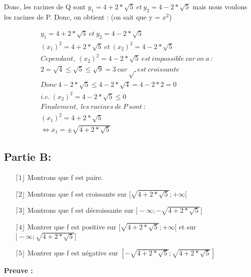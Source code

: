 \documentclass[a4paper, 12pt]{article}
\begin{document}
Donc, les racines de Q sont \( y_1 = 4 + 2 * \sqrt{5} ~ et ~ y_2 = 4 - 2 * \sqrt{5}  \) mais nous voulons les racines de P. Donc, on obtient : (on sait que y = $x^2$)


\begin{align*}
	y_1 = 4 + 2 * \sqrt{5} ~ et ~ y_2 = 4 - 2 * \sqrt{5} \\
	(x_1)^2 = 4 + 2 * \sqrt{5} ~ et ~ (x_2)^2 = 4 - 2 * \sqrt{5} \\
	Cependant, ~ (x_2)^2 = 4 - 2 * \sqrt{5} ~ est ~ impossible ~ car ~ on ~ a ~ : \\
	2 = \sqrt{4} \leq \sqrt{5} \leq \sqrt{9} = 3 ~ car ~ \surd ~ est ~ croissante \\
	Donc ~ 4 - 2 * \sqrt{5} \leq 4 - 2 * \sqrt{4} = 4 - 2 * 2 = 0 \\
	i.e. ~ (x_2)^2 = 4 - 2 * \sqrt{5} \leq 0 ~~~~~~~~~~~~~~~~~~~~~~~~~ \\
	Finalement, ~ les ~ racines ~ de ~ P ~ sont ~ : \\
	(x_1)^2 = 4 + 2 * \sqrt{5} \\
	\Leftrightarrow x_1 = \pm \sqrt{4 + 2 * \sqrt{5}}	
\end{align*}


\newpage
\subsection{Partie B:}

\begin{itemize}
	\item[\(\lceil 1 \rfloor\)] Montrons que f est paire.
	\item[\(\lceil 2 \rfloor\)] Montrons que f est croissante sur \( [ \sqrt{4 + 2 * \sqrt{5}} ; +\infty [ \)
	\item[\(\lceil 3 \rfloor\)] Montrons que f est décroissante sur \( ] -\infty ; -\sqrt{4 + 2 * \sqrt{5}} ] \)
	\item[\(\lceil 4 \rfloor\)] Montrer que f est positive sur \( [ \sqrt{4 + 2 * \sqrt{5}} ; +\infty [ \) et sur \( ] -\infty ; \sqrt{4 + 2 * \sqrt{5}} ] \)
	\item[\(\lceil 5 \rfloor\)] Montrer que f est négative sur \( [ -\sqrt{4 + 2 * \sqrt{5}} ; \sqrt{4 + 2 * \sqrt{5}} ] \)
\end{itemize}

\textbf{Preuve :}
\end{document}
